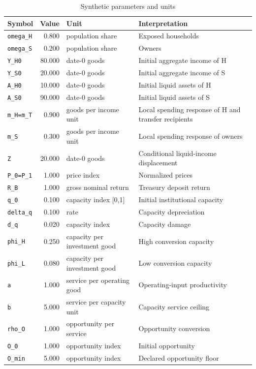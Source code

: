 \begin{longtable}{@{}p{}rp{}p{}@{}}
\caption{Synthetic parameters and units}\label{tab:synthetic-parameters}\\
\toprule Symbol & Value & Unit & Interpretation \\
\midrule
\endhead
\texttt{omega\_H} & 0.800 & population share & Exposed households \\
\texttt{omega\_S} & 0.200 & population share & Owners \\
\texttt{Y\_H0} & 80.000 & date-0 goods & Initial aggregate income of H \\
\texttt{Y\_S0} & 20.000 & date-0 goods & Initial aggregate income of S \\
\texttt{A\_H0} & 10.000 & date-0 goods & Initial liquid assets of H \\
\texttt{A\_S0} & 90.000 & date-0 goods & Initial liquid assets of S \\
\texttt{m\_H=m\_T} & 0.900 & goods per income unit & Local spending response of H and transfer recipients \\
\texttt{m\_S} & 0.300 & goods per income unit & Local spending response of owners \\
\texttt{Z} & 20.000 & date-0 goods & Conditional liquid-income displacement \\
\texttt{P\_0=P\_1} & 1.000 & price index & Normalized prices \\
\texttt{R\_B} & 1.000 & gross nominal return & Treasury deposit return \\
\texttt{q\_0} & 0.100 & capacity index [0,1] & Initial institutional capacity \\
\texttt{delta\_q} & 0.100 & rate & Capacity depreciation \\
\texttt{d\_q} & 0.020 & capacity index & Capacity damage \\
\texttt{phi\_H} & 0.250 & capacity per investment good & High conversion capacity \\
\texttt{phi\_L} & 0.080 & capacity per investment good & Low conversion capacity \\
\texttt{a} & 1.000 & service per operating good & Operating-input productivity \\
\texttt{b} & 5.000 & service per capacity unit & Capacity service ceiling \\
\texttt{rho\_O} & 1.000 & opportunity per service & Opportunity conversion \\
\texttt{O\_0} & 1.000 & opportunity index & Initial opportunity \\
\texttt{O\_min} & 5.000 & opportunity index & Declared opportunity floor \\
\bottomrule
\end{longtable}

